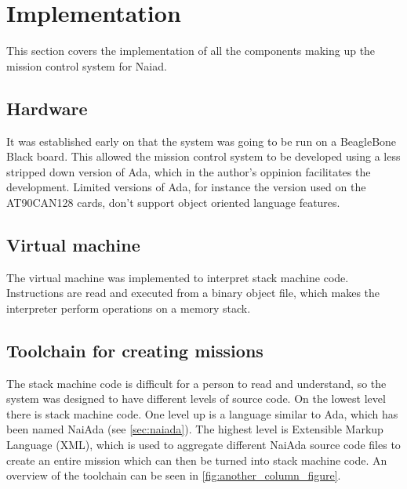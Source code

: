 \section{Implementation}\label{sec:implementation}
This section covers the implementation of all the components making up the mission control system for Naiad.
\subsection{Hardware}
It was established early on that the system was going to be run on a BeagleBone Black \cite{web:mcsbbb} board. This allowed the mission control system to be developed using a less stripped down version of Ada, which in the author's oppinion facilitates the development. Limited versions of Ada, for instance the version used on the AT90CAN128 \cite{web:mcsatcan} cards, don't support object oriented language features.

\subsection{Virtual machine}
The virtual machine was implemented to interpret stack machine code. Instructions are read and executed from a binary object file, which makes the interpreter perform operations on
a memory stack.

\subsection{Toolchain for creating missions}
The stack machine code is difficult for a person to read and understand, so the system was designed to have different levels of source code. On the lowest level there is
stack machine code. One level up is a language similar to Ada, which has been named NaiAda (see \cref{sec:naiada}). The highest level is Extensible Markup Language (XML), which is used to aggregate different NaiAda source code files
to create an entire mission which can then be turned into stack machine code. An overview of the toolchain can be seen in \cref{fig:another_column_figure}.

